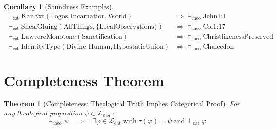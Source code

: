 \documentclass{article}
\newtheorem{theorem}{Theorem}
\newtheorem{corollary}{Corollary}
\begin{document}
\begin{corollary}[Soundness Examples]
\begin{align*}
\vdash_{\text{cat}} \text{KanExt}(\text{Logos}, \text{Incarnation}, \text{World}) &\Rightarrow \models_{\text{theo}} \text{John1:1} \\
\vdash_{\text{cat}} \text{SheafGluing}(\text{AllThings}, \{\text{LocalObservations}\}) &\Rightarrow \models_{\text{theo}} \text{Col1:17} \\
\vdash_{\text{cat}} \text{LawvereMonotone}(\text{Sanctification}) &\Rightarrow \models_{\text{theo}} \text{ChristlikenessPreserved} \\
\vdash_{\text{cat}} \text{IdentityType}(\text{Divine}, \text{Human}, \text{HypostaticUnion}) &\Rightarrow \models_{\text{theo}} \text{Chalcedon}
\end{align*}
\end{corollary}

\section{Completeness Theorem}

\begin{theorem}[Completeness: Theological Truth Implies Categorical Proof]
For any theological proposition $\psi \in \mathcal{L}_{\text{theo}}$:
\[
\models_{\text{theo}} \psi \quad \Rightarrow \quad \exists \varphi \in \mathcal{L}_{\text{cat}} \text{ with } \tau(\varphi) = \psi \text{ and } \vdash_{\text{cat}} \varphi
\]
\end{theorem}
\end{document}
